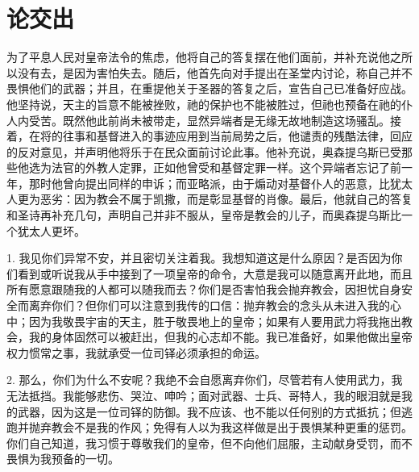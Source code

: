 
\chapter{论交出}



为了平息人民对皇帝法令的焦虑，他将自己的答复摆在他们面前，并补充说他之所以没有去，是因为害怕失去。随后，他首先向对手提出在圣堂内讨论，称自己并不畏惧他们的武器；并且，在重提他关于圣器的答复之后，宣告自己已准备好应战。他坚持说，天主的旨意不能被挫败，祂的保护也不能被胜过，但祂也预备在祂的仆人内受苦。既然他此前尚未被带走，显然异端者是无缘无故地制造这场骚乱。接着，在将的往事和基督进入的事迹应用到当前局势之后，他谴责的残酷法律，回应的反对意见，并声明他将乐于在民众面前讨论此事。他补充说，奥森提乌斯已受那些他选为法官的外教人定罪，正如他曾受和基督定罪一样。这个异端者忘记了前一年，那时他曾向提出同样的申诉；而亚略派，由于煽动对基督仆人的恶意，比犹太人更为恶劣：因为教会不属于凯撒，而是彰显基督的肖像。最后，他就自己的答复和圣诗再补充几句，声明自己并非不服从，皇帝是教会的儿子，而奥森提乌斯比一个犹太人更坏。\par

1. 我见你们异常不安，并且密切关注着我。我想知道这是什么原因？是否因为你们看到或听说我从手中接到了一项皇帝的命令，大意是我可以随意离开此地，而且所有愿意跟随我的人都可以随我而去？你们是否害怕我会抛弃教会，因担忧自身安全而离弃你们？但你们可以注意到我传的口信：抛弃教会的念头从未进入我的心中；因为我敬畏宇宙的天主，胜于敬畏地上的皇帝；如果有人要用武力将我拖出教会，我的身体固然可以被赶出，但我的心志却不能。我已准备好，如果他做出皇帝权力惯常之事，我就承受一位司铎必须承担的命运。\par

2. 那么，你们为什么不安呢？我绝不会自愿离弃你们，尽管若有人使用武力，我无法抵挡。我能够悲伤、哭泣、呻吟；面对武器、士兵、哥特人，我的眼泪就是我的武器，因为这是一位司铎的防御。我不应该、也不能以任何别的方式抵抗；但逃跑并抛弃教会不是我的作风；免得有人以为我这样做是出于畏惧某种更重的惩罚。你们自己知道，我习惯于尊敬我们的皇帝，但不向他们屈服，主动献身受罚，而不畏惧为我预备的一切。\par

